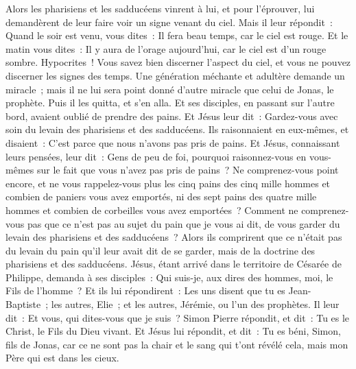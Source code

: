 \begin{multicols}{2}
\VerseOne{}Alors les pharisiens et les sadducéens vinrent à lui, et pour l'éprouver, lui demandèrent de leur faire voir un signe venant du ciel.
Mais il leur répondit~: Quand le soir est venu, vous dites~: Il fera beau temps, car le ciel est rouge.
Et le matin vous dites~: Il y aura de l'orage aujourd'hui, car le ciel est d'un rouge sombre. Hypocrites~! Vous savez bien discerner l'aspect du ciel, et vous ne pouvez discerner les signes des temps.
Une génération méchante et adultère demande un miracle~; mais il ne lui sera point donné d'autre miracle que celui de Jonas, le prophète. Puis il les quitta, et s'en alla.
Et ses disciples, en passant sur l'autre bord, avaient oublié de prendre des pains.
Et Jésus leur dit~: Gardez-vous avec soin du levain des pharisiens et des sadducéens.
Ils raisonnaient en eux-mêmes, et disaient~: C'est parce que nous n'avons pas pris de pains.
Et Jésus, connaissant leurs pensées, leur dit~: Gens de peu de foi, pourquoi raisonnez-vous en vous-mêmes sur le fait que vous n'avez pas pris de pains~?
Ne comprenez-vous point encore, et ne vous rappelez-vous plus les cinq pains des cinq mille hommes et combien de paniers vous avez emportés,
ni des sept pains des quatre mille hommes et combien de corbeilles vous avez emportées~?
Comment ne comprenez-vous pas que ce n'est pas au sujet du pain que je vous ai dit, de vous garder du levain des pharisiens et des sadducéens~?
Alors ils comprirent que ce n'était pas du levain du pain qu'il leur avait dit de se garder, mais de la doctrine des pharisiens et des sadducéens.
Jésus, étant arrivé dans le territoire de Césarée de Philippe, demanda à ses disciples~: Qui suis-je, aux dires des hommes, moi, le Fils de l'homme~?
Et ils lui répondirent~: Les uns disent que tu es Jean-Baptiste~; les autres, Elie~; et les autres, Jérémie, ou l'un des prophètes.
Il leur dit~: Et vous, qui dites-vous que je suis~?
Simon Pierre répondit, et dit~: Tu es le Christ, le Fils du Dieu vivant.
Et Jésus lui répondit, et dit~: Tu es béni, Simon, fils de Jonas, car ce ne sont pas la chair et le sang qui t'ont révélé cela, mais mon Père qui est dans les cieux.

\end{multicols}
